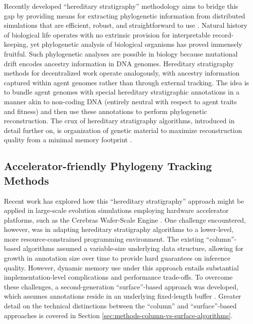 Recently developed ``hereditary stratigraphy'' methodology aims to bridge this gap by providing means for extracting phylogenetic information from distributed simulations that are efficient, robust, and straightforward to use \citep{moreno2022hereditary}.
Natural history of biological life operates with no extrinsic provision for interpretable record-keeping, yet phylogenetic analysis of biological organisms has proved immensely fruitful.
Such phylogenetic analyses are possible in biology because mutational drift encodes ancestry information in DNA genomes.
Hereditary stratigraphy methods for decentralized work operate analogously, with ancestry information captured within agent genomes rather than through external tracking.
The idea is to bundle agent genomes with special hereditary stratigraphic annotations in a manner akin to non-coding DNA (entirely neutral with respect to agent traits and fitness) and then use these annotations to perform phylogenetic reconstruction.
The crux of hereditary stratigraphy algorithms, introduced in detail further on, is organization of genetic material to maximize reconstruction quality from a minimal memory footprint \citep{moreno2022hereditary}.

\subsection{Accelerator-friendly Phylogeny Tracking Methods}

Recent work has explored how this ``hereditary stratigraphy'' approach might be applied in large-scale evolution simulations employing hardware accelerator platforms, such as the Cerebras Wafer-Scale Engine \citep{moreno2024trackable}.
One challenge encountered, however, was in adapting hereditary stratigraphy algorithms to a lower-level, more resource-constrained programming environment.
The existing ``column''-based algorithms assumed a variable-size underlying data structure, allowing for growth in annotation size over time to provide hard guarantees on inference quality.
However, dynamic memory use under this approach entails substantial implementation-level complications and performance trade-offs.
To overcome these challenges, a second-generation ``surface''-based approach was developed, which assumes annotations reside in an underlying fixed-length buffer \citep{moreno2024algorithms}.
Greater detail on the technical distinctions between the ``column'' and ``surface''-based approaches is covered in Section \ref{sec:methods-column-vs-surface-algorithms}.

